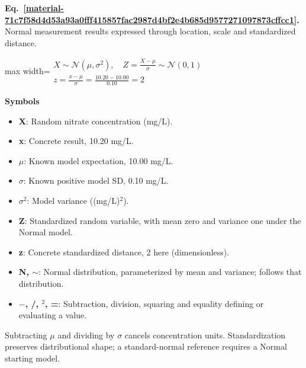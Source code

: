 \documentclass[11pt,a4paper]{article}
\begin{document}
\par\medskip
\begin{samepage}
\label{material-71c7f58d4d53a93a0fff415857fac2987d4bf2e4b685d9577271097873cffcc1}
\noindent\textbf{Eq.~\ref*{material-71c7f58d4d53a93a0fff415857fac2987d4bf2e4b685d9577271097873cffcc1}.} Normal measurement results expressed through location, scale and standardized distance.\par\nopagebreak
\begin{center}\begin{adjustbox}{max width=\linewidth}$\displaystyle \begin{gathered}X\sim\mathcal N(\mu,\sigma^2),\quad Z=\frac{X-\mu}{\sigma}\sim\mathcal N(0,1)\\z=\frac{x-\mu}{\sigma}=\frac{10.20-10.00}{0.10}=2\end{gathered}$\end{adjustbox}\end{center}

\par\noindent\textbf{Symbols}

\begin{itemize}\setlength{\itemsep}{1pt}\setlength{\parsep}{0pt}
\item \textbf{X}: Random nitrate concentration (mg/L).
\item \textbf{x}: Concrete result, 10.20 mg/L.
\item \textbf{\ensuremath{\mu}}: Known model expectation, 10.00 mg/L.
\item \textbf{\ensuremath{\sigma}}: Known positive model SD, 0.10 mg/L.
\item \textbf{\ensuremath{\sigma}\ensuremath{{}^2}}: Model variance ((mg/L)\ensuremath{{}^2}).
\item \textbf{Z}: Standardized random variable, with mean zero and variance one under the Normal model.
\item \textbf{z}: Concrete standardized distance, 2 here (dimensionless).
\item \textbf{N, \ensuremath{\sim}}: Normal distribution, parameterized by mean and variance; follows that distribution.
\item \textbf{\ensuremath{-}, /, \ensuremath{{}^2}, =}: Subtraction, division, squaring and equality defining or evaluating a value.
\end{itemize}

Subtracting \ensuremath{\mu} and dividing by \ensuremath{\sigma} cancels concentration units. Standardization preserves distributional shape; a standard-normal reference requires a Normal starting model.

\end{samepage}
\medskip
\end{document}
